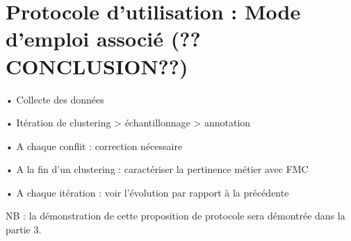     
    \section{Protocole d'utilisation : Mode d'emploi associé (??CONCLUSION??)}

        •	Collecte des données

        •	Itération de clustering > échantillonnage > annotation

        •	A chaque conflit : correction nécessaire

        •	A la fin d’un clustering : caractériser la pertinence métier avec FMC

        •	A chaque itération : voir l’évolution par rapport à la précédente

        NB : la démonstration de cette proposition de protocole sera démontrée dans la partie 3.